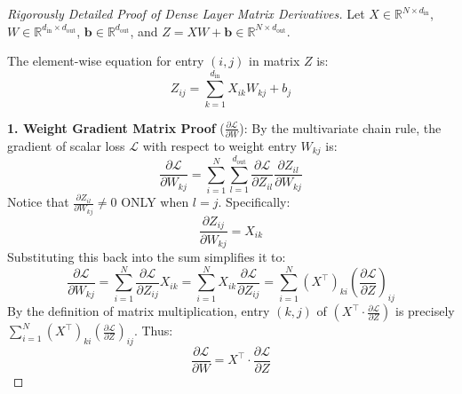 \documentclass[12pt, a4paper]{report}
\theoremstyle{definition}
\begin{document}
\begin{proof}[Rigorously Detailed Proof of Dense Layer Matrix Derivatives]
Let $X \in \mathbb{R}^{N \times d_\text{in}}$, $W \in \mathbb{R}^{d_\text{in} \times d_\text{out}}$, $\mathbf{b} \in \mathbb{R}^{d_\text{out}}$, and $Z = X W + \mathbf{b} \in \mathbb{R}^{N \times d_\text{out}}$.

The element-wise equation for entry $(i, j)$ in matrix $Z$ is:
\begin{equation}
    Z_{ij} = \sum_{k=1}^{d_\text{in}} X_{ik} W_{kj} + b_j
\end{equation}

\textbf{1. Weight Gradient Matrix Proof} ($\frac{\partial \mathcal{L}}{\partial W}$):
By the multivariate chain rule, the gradient of scalar loss $\mathcal{L}$ with respect to weight entry $W_{kj}$ is:
\begin{equation}
    \frac{\partial \mathcal{L}}{\partial W_{kj}} = \sum_{i=1}^{N} \sum_{l=1}^{d_\text{out}} \frac{\partial \mathcal{L}}{\partial Z_{il}} \frac{\partial Z_{il}}{\partial W_{kj}}
\end{equation}
Notice that $\frac{\partial Z_{il}}{\partial W_{kj}} \neq 0$ ONLY when $l = j$. Specifically:
\begin{equation}
    \frac{\partial Z_{ij}}{\partial W_{kj}} = X_{ik}
\end{equation}
Substituting this back into the sum simplifies it to:
\begin{equation}
    \frac{\partial \mathcal{L}}{\partial W_{kj}} = \sum_{i=1}^{N} \frac{\partial \mathcal{L}}{\partial Z_{ij}} X_{ik} = \sum_{i=1}^{N} X_{ik} \frac{\partial \mathcal{L}}{\partial Z_{ij}} = \sum_{i=1}^{N} (X^\top)_{ki} \left(\frac{\partial \mathcal{L}}{\partial Z}\right)_{ij}
\end{equation}
By the definition of matrix multiplication, entry $(k, j)$ of $(X^\top \cdot \frac{\partial \mathcal{L}}{\partial Z})$ is precisely $\sum_{i=1}^N (X^\top)_{ki} (\frac{\partial \mathcal{L}}{\partial Z})_{ij}$. Thus:
\begin{equation}
    \boxed{\frac{\partial \mathcal{L}}{\partial W} = X^\top \cdot \frac{\partial \mathcal{L}}{\partial Z}}
\end{equation}


\end{proof}
\end{document}
